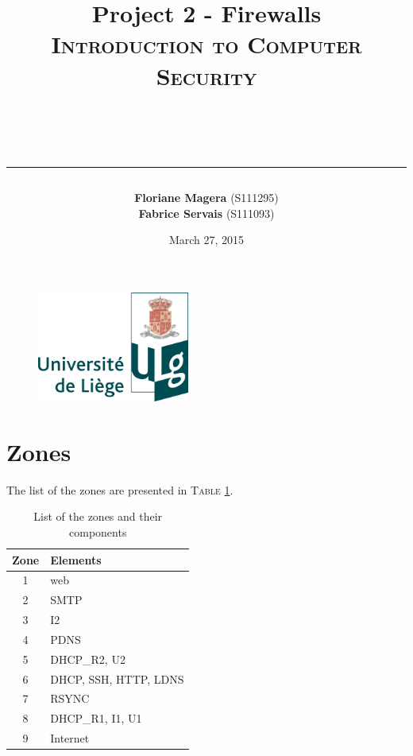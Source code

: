 \documentclass[a4paper,titlepage]{article}
\begin{document}
\begin{titlepage}

\begin{figure}
\centering
\includegraphics[width=5cm]{logo-ulg.png}
\end{figure}



\title{
\vspace{0.2cm}
\LARGE{\textbf{Project 2 - Firewalls}} \\ \textsc{Introduction to Computer Security}
\author{\textbf{Floriane Magera} \small{(S111295})\\\textbf{Fabrice Servais} \small{(S111093})}\\
\date{March 27, 2015}
\rule{15cm}{1.5pt}
}

\end{titlepage}

\pagestyle{fancy}

\maketitle

\section{Zones}
\label{sec:Zones}

The list of the zones are presented in \textsc{Table} \ref{list}.

\begin{table}[h]
	\center
	\begin{tabular}{c|l}
		Zone & Elements\\
		\hline
		1 & web\\
		2 & SMTP\\
		3 & I2\\
		4 & PDNS\\
		5 & DHCP\_R2, U2\\
		6 & DHCP, SSH, HTTP, LDNS\\
		7 & RSYNC\\
		8 & DHCP\_R1, I1, U1\\
		9 & Internet\\
	\end{tabular}
	\caption{List of the zones and their components}
	\label{list}
\end{table}
\end{document}
